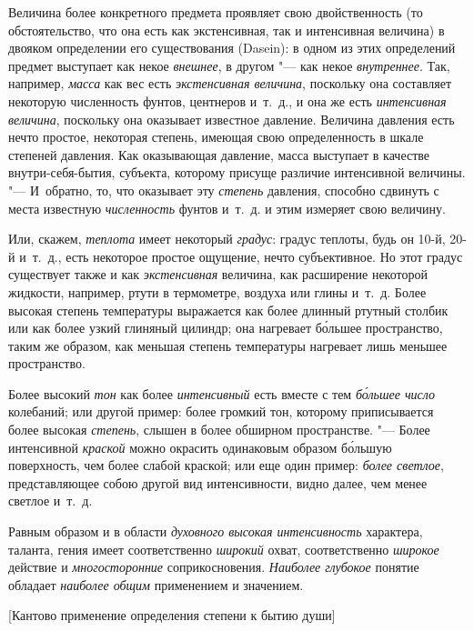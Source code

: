 Величина более конкретного предмета проявляет свою двойственность (то
обстоятельство, что она есть как экстенсивная, так и интенсивная величина)
в двояком определении его существования (Dasein): в одном из этих определений
предмет выступает как некое {\em внешнее}, в другом "--- как некое
{\em внутреннее}. Так, например, {\em масса} как вес есть {\em экстенсивная
величина}, поскольку она составляет некоторую численность фунтов, центнеров
и~т.~д., и она же есть {\em интенсивная величина}, поскольку она оказывает
известное давление. Величина давления есть нечто простое, некоторая степень,
имеющая свою определенность в шкале степеней давления. Как оказывающая
давление, масса выступает в качестве внутри-себя-бытия, субъекта, которому
присуще различие интенсивной величины. "--- И~обратно, то, что оказывает эту
{\em степень} давления, способно сдвинуть с места известную {\em численность}
фунтов и~т.~д. и этим измеряет свою величину.

Или, скажем, {\em теплота} имеет некоторый {\em градус}: градус теплоты, будь
он 10-й, 20-й и~т.~д., есть некоторое простое ощущение, нечто субъективное. Но
этот градус существует также и как {\em экстенсивная} величина, как расширение
некоторой жидкости, например, ртути в термометре, воздуха или глины и~т.~д.
Более высокая степень температуры выражается как более длинный ртутный столбик
или как более узкий глиняный цилиндр; она нагревает б\'{о}льшее пространство,
таким же образом, как меньшая степень температуры нагревает лишь меньшее
пространство.

Более высокий {\em тон} как более {\em интенсивный} есть вместе с тем
{\em б\'{о}льшее число} колебаний; или другой пример: более громкий тон,
которому приписывается более высокая {\em степень}, слышен в более обширном
пространстве. "--- Более интенсивной {\em краской} можно окрасить одинаковым
образом б\'{о}льшую поверхность, чем более слабой краской; или еще один пример:
{\em более светлое}, представляющее собою другой вид интенсивности, видно
далее, чем менее светлое и~т.~д.

Равным образом и в области {\em духовного высокая интенсивность} характера,
таланта, гения имеет соответственно {\em широкий} охват, соответственно
{\em широкое} действие и {\em многосторонние} соприкосновения.
{\em Наиболее глубокое} понятие обладает {\em наиболее общим}
применением и значением.

%
{[Кантово применение определения степени к бытию души]}

